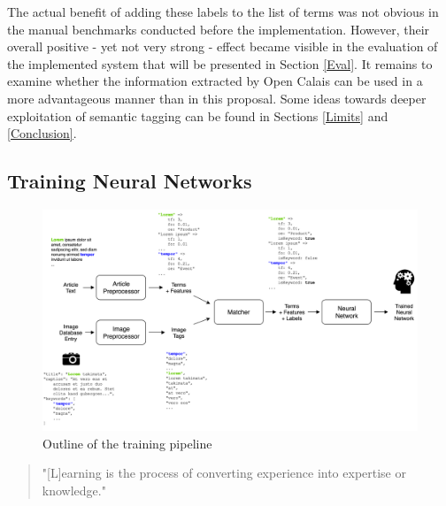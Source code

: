 \documentclass[11pt,a4paper,twoside]{article}
\begin{document}
The actual benefit of adding these labels to the list of terms was not obvious in the manual benchmarks conducted before the implementation. However, their overall positive - yet not very strong - effect became visible in the evaluation of the implemented system that will be presented in Section \ref{Eval}. It remains to examine whether the information extracted by Open Calais can be used in a more advantageous manner than in this proposal. Some ideas towards deeper exploitation of semantic tagging can be found in Sections \ref{Limits} and \ref{Conclusion}.

\subsection{Training Neural Networks} \label{SystemTrain}

\begin{figure}[t]
  \includegraphics[width=\columnwidth]{picpic-training.png}
  \caption{Outline of the training pipeline}
  \label{fig:picpic-training}
\end{figure}

\begin{quote}
    "[L]earning is the process of converting experience into expertise or knowledge."
    
    \cite[p. 1]{Ben-David2014UnderstandingAlgorithms}
\end{quote}
\end{document}
